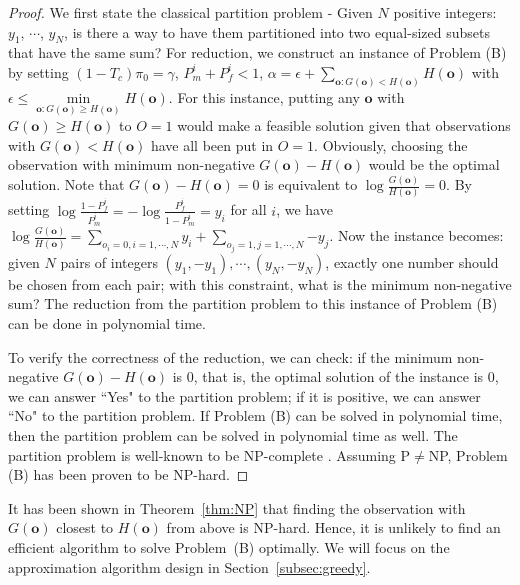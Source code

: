 \documentclass[conference]{IEEEtran}
\begin{document}
\begin{proof}
We first state the classical partition problem \cite{Garey} - Given $N$ positive integers: $y_1$, $\cdots$, $y_{N}$, is there a way to have them partitioned into two equal-sized subsets that have the same sum? For reduction, we construct an instance of Problem (B) by setting $(1-T_c){\pi}_0=\gamma$, $P_m^i+P_f^i<1$, $\alpha=\epsilon+\sum\limits_{\boldsymbol{o}:G(\boldsymbol{o})<H(\boldsymbol{o})}{H(\boldsymbol{o})}$ with $\epsilon\le \min\limits_{\boldsymbol{o}:G(\boldsymbol{o})\ge H(\boldsymbol{o})}{H(\boldsymbol{o})}$. For this instance, putting any $\boldsymbol{o}$ with $G(\boldsymbol{o})\ge H(\boldsymbol{o})$ to $O=1$ would make a feasible solution given that observations with $G(\boldsymbol{o})<H(\boldsymbol{o})$ have all been put in $O=1$. Obviously, choosing the observation with minimum non-negative $G(\boldsymbol{o})-H(\boldsymbol{o})$ would be the optimal solution. Note that $G(\boldsymbol{o})-H(\boldsymbol{o})=0$ is equivalent to $\log{\frac{G(\boldsymbol{o})}{H(\boldsymbol{o})}}=0$. By setting $\log{\frac{1-P_f^i}{P_m^i}}=-\log{\frac{P_f^i}{1-P_m^i}}=y_i$ for all $i$, we have $\log{\frac{G(\boldsymbol{o})}{H(\boldsymbol{o})}}=\sum\limits_{o_i=0,i=1,\cdots,N}{y_i}+\sum\limits_{o_j=1,j=1,\cdots,N}{-y_j}$. Now the instance becomes: given $N$ pairs of integers $(y_1,-y_1),\cdots,(y_N,-y_N)$, exactly one number should be chosen from each pair; with this constraint, what is the minimum non-negative sum? The reduction from the partition problem to this instance of Problem (B) can be done in polynomial time.

To verify the correctness of the reduction, we can check: if the minimum non-negative $G(\boldsymbol{o})-H(\boldsymbol{o})$ is $0$, that is, the optimal solution of the instance is $0$, we can answer ``Yes" to the partition problem; if it is positive, we can answer ``No" to the partition problem. If Problem (B) can be solved in polynomial time, then the partition problem can be solved in polynomial time as well. The partition problem is well-known to be NP-complete \cite{Garey}. Assuming P$\neq$NP, Problem (B) has been proven to be NP-hard.
\end{proof}

It has been shown in Theorem~\ref{thm:NP} that finding the observation with $G(\boldsymbol{o})$ closest to $H(\boldsymbol{o})$ from above is NP-hard. Hence, it is unlikely to find an efficient algorithm to solve Problem~(B) optimally. We will focus on the approximation algorithm design in Section~\ref{subsec:greedy}.  
\end{document}
